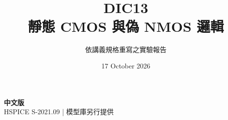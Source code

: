 \documentclass[11pt,a4paper]{article}
\title{\color{accent}DIC13\\[4pt]靜態 CMOS 與偽 NMOS 邏輯}
\author{依講義規格重寫之實驗報告}
\date{17 October 2026}
\begin{document}
\maketitle
\begin{center}\small\textbf{中文版}\\
HSPICE S-2021.09 \quad | \quad 模型庫另行提供
\end{center}


\end{document}
